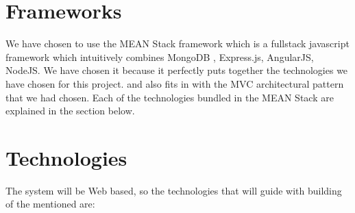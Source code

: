 \documentclass{article}
\begin{document}
	\section{Frameworks}
	We have chosen to use the MEAN Stack framework which is a fullstack javascript framework which intuitively combines MongoDB , Express.js, AngularJS, NodeJS. We have chosen it because it perfectly puts together the technologies we have chosen for this project. and also fits in with the MVC architectural pattern that we had chosen. Each of the technologies bundled in the MEAN Stack are explained in the section below.
	
	
	\section{Technologies}%
	
	 
	 The system will be Web based, so the technologies that will guide with building of the mentioned are:
	 
\end{document}

